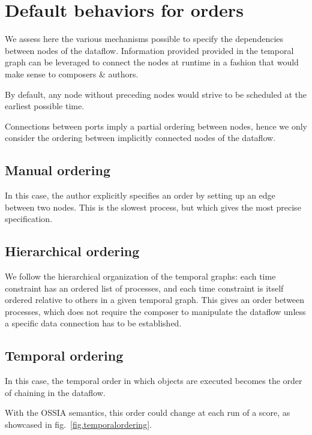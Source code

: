 \documentclass{article}
\begin{document}
\section{Default behaviors for orders}
\label{sec.order}
We assess here the various mechanisms possible to specify the dependencies between nodes of the dataflow.
Information provided provided in the temporal graph can be leveraged to connect the nodes at runtime in a fashion 
that would make sense to composers \& authors.
    
By default, any node without preceding nodes would strive to be scheduled at the earliest possible time.
    
Connections between ports imply a partial ordering between nodes, hence we only consider the ordering between implicitly connected nodes of the dataflow.
    
\subsection{Manual ordering}
In this case, the author explicitly specifies an order by setting up an edge between two nodes. 
This is the slowest process, but which gives the most precise specification.
    
\subsection{Hierarchical ordering}
We follow the hierarchical organization of the temporal graphs: each time constraint has an ordered list of processes, and each time constraint is itself ordered relative to others in a given temporal graph. 
This gives an order between processes, which does not require the composer to manipulate the dataflow unless a specific data connection has to be established.
    
\subsection{Temporal ordering}
In this case, the temporal order in which objects are executed
becomes the order of chaining in the dataflow.

With the OSSIA semantics, this order could change at each run of a score, as showcased in fig.~\ref{fig.temporalordering}.
    
\end{document}
